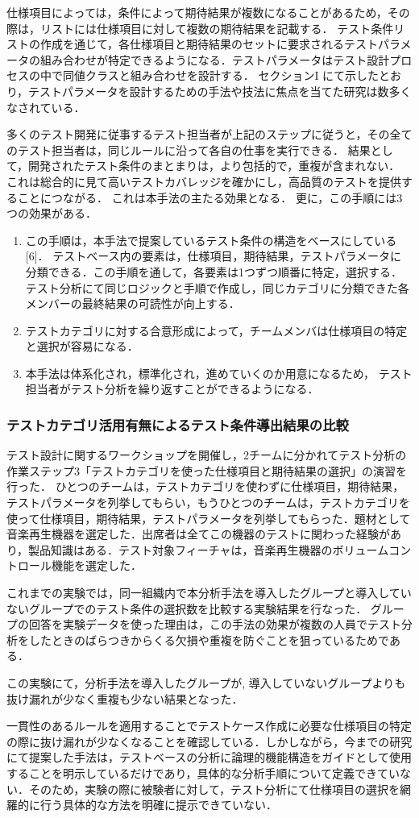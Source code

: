 仕様項目によっては，条件によって期待結果が複数になることがあるため，その際は，リストには仕様項目に対して複数の期待結果を記載する．
テスト条件リストの作成を通じて，各仕様項目と期待結果のセットに要求されるテストパラメータの組み合わせが特定できるようになる．テストパラメータはテスト設計プロセスの中で同値クラスと組み合わせを設計する．
セクションI にて示したとおり，テストパラメータを設計するための手法や技法に焦点を当てた研究は数多くなされている．


多くのテスト開発に従事するテスト担当者が上記のステップに従うと，その全てのテスト担当者は，同じルールに沿って各自の仕事を実行できる．
結果として，開発されたテスト条件のまとまりは，より包括的で，重複が含まれない．
これは総合的に見て高いテストカバレッジを確かにし，高品質のテストを提供することにつながる．
これは本手法の主たる効果となる．
更に，この手順には3つの効果がある．

\begin{enumerate}
\item この手順は，本手法で提案しているテスト条件の構造をベースにしている [6]． テストベース内の要素は，仕様項目，期待結果，テストパラメータに分類できる．この手順を通して，各要素は1つずつ順番に特定，選択する． テスト分析にて同じロジックと手順で作成し，同じカテゴリに分類できた各メンバーの最終結果の可読性が向上する．
\item テストカテゴリに対する合意形成によって，チームメンバは仕様項目の特定と選択が容易になる．
\item 本手法は体系化され，標準化され，進めていくのか用意になるため， テスト担当者がテスト分析を繰り返すことができるようになる．
\end{enumerate}

\subsubsection{テストカテゴリ活用有無によるテスト条件導出結果の比較}

テスト設計に関するワークショップを開催し，2チームに分かれてテスト分析の作業ステップ3「テストカテゴリを使った仕様項目と期待結果の選択」の演習を行った．
ひとつのチームは，テストカテゴリを使わずに仕様項目，期待結果，テストパラメータを列挙してもらい，もうひとつのチームは，テストカテゴリを使って仕様項目，期待結果，テストパラメータを列挙してもらった．題材として音楽再生機器を選定した．出席者は全てこの機器のテストに関わった経験があり，製品知識はある．テスト対象フィーチャは，音楽再生機器のボリュームコントロール機能を選定した．

これまでの実験では，同一組織内で本分析手法を導入したグループと導入していないグループでのテスト条件の選択数を比較する実験結果を行なった．
グループの回答を実験データを使った理由は，この手法の効果が複数の人員でテスト分析をしたときのばらつきからくる欠損や重複を防ぐことを狙っているためである．

この実験にて，分析手法を導入したグループが, 導入していないグループよりも抜け漏れが少なく重複も少ない結果となった．

一貫性のあるルールを適用することでテストケース作成に必要な仕様項目の特定の際に抜け漏れが少なくなることを確認している．しかしながら，今までの研究にて提案した手法は，テストベースの分析に論理的機能構造をガイドとして使用することを明示しているだけであり，具体的な分析手順について定義できていない．そのため，実験の際に被験者に対して，テスト分析にて仕様項目の選択を網羅的に行う具体的な方法を明確に提示できていない．
